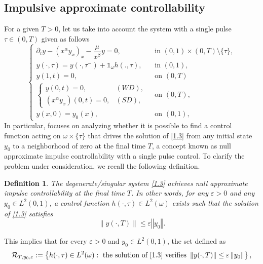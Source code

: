 \documentclass[sn-mathphys]{sn-jnl}
\newtheorem{definition}[theorem]{Definition}
\begin{document}
\subsection{Impulsive approximate controllability}
For a given $T>0$, let us take into account the system with a single pulse $\tau \in (0,T)$ given as follows
    \begin{equation}\label{1.3}
        \begin{cases}\partial_t y-\left(x^\alpha y_x\right)_x-\dfrac{\mu}{x^\beta} y=0, & \text { in }(0,1) \times(0, T) \setminus \{\tau\}, \\ 
        y(\cdot, \tau)=y\left(\cdot, \tau^{-}\right)+\mathds{1}_{\omega} h(.,\tau), &\text { in } (0,1),\\
        y(1, t)=0,  & \text { on }(0, T)\\
        \left\{\begin{array}{ll}
        y(0, t)=0, & (W D), \\
        \left(x^\alpha y_x\right)(0, t)=0, & (S D),
        \end{array} \right. &\text { on }(0, T),\\
        y(x, 0)=y_0(x), & \text { on }(0,1),
        \end{cases}
    \end{equation}
In particular, \cite{MMOS} focuses on analyzing whether it is possible to find a control function acting on \( \omega \times \{\tau\} \) that drives the solution of \eqref{1.3} from any initial state \( y_0 \) to a neighborhood of zero at the final time \( T \), a concept known as null approximate impulse controllability with a single pulse control. To clarify the problem under consideration, we recall the following definition.
\begin{definition}
The degenerate/singular system \eqref{1.3} achieves null approximate impulse controllability at the final time $T$. In other words, for any $\varepsilon > 0$ and any $y_0 \in L^2(0,1)$, a control function $h(\cdot, \tau) \in L^2(\omega)$ exists such that the solution of \eqref{1.3} satisfies
    \begin{equation*}
        \|y(\cdot, T)\| \leq \varepsilon\left\Vert y_0\right\Vert .
    \end{equation*}
\end{definition}
\noindent This implies that for every $\varepsilon >0$ and $y_0 \in L^2(0,1)$, the set defined as
\begin{equation*}
\mathcal{R}_{T, y_0, \varepsilon} :=\left\{h(\cdot, \tau) \in L^{2}(\omega): \text { the solution of }\eqref{1.3}\text { verifies }\left\Vert y(\cdot, T)\right\Vert \leq \varepsilon\left\Vert y_0\right\Vert\right\},
\end{equation*}
\end{document}
